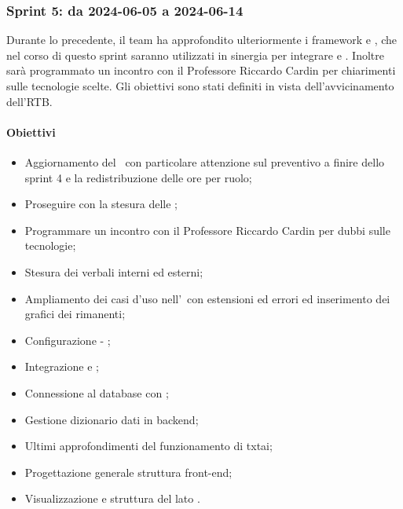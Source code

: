\subsubsection{Sprint 5: da 2024-06-05 a 2024-06-14}
\par Durante lo  precedente, il team ha approfondito ulteriormente i framework  e , che nel corso di questo sprint saranno utilizzati in sinergia per integrare  e .
Inoltre sarà programmato un incontro con il Professore Riccardo Cardin per chiarimenti sulle tecnologie scelte. Gli obiettivi sono stati definiti in vista dell'avvicinamento dell'RTB. 


\paragraph{Obiettivi}
\begin{itemize}
  \item Aggiornamento del \PdP\ con particolare attenzione sul preventivo a finire dello sprint 4 e la redistribuzione delle ore per ruolo;
  \item Proseguire con la stesura delle \NdP;
  \item Programmare un incontro con il Professore Riccardo Cardin per dubbi sulle tecnologie;
  \item Stesura dei verbali interni ed esterni;
  \item Ampliamento dei casi d'uso nell'\AdR\ con estensioni ed errori ed inserimento dei grafici dei  rimanenti;
  \item Configurazione  - ;
  \item Integrazione  e ;
  \item Connessione al database con ;
  \item Gestione  dizionario dati in backend;
  \item Ultimi approfondimenti del funzionamento di txtai;
  \item Progettazione generale struttura front-end;
  \item Visualizzazione  e struttura del  lato .
\end{itemize}

\vspace{0.5\baselineskip}
\par [Inserire Gantt]